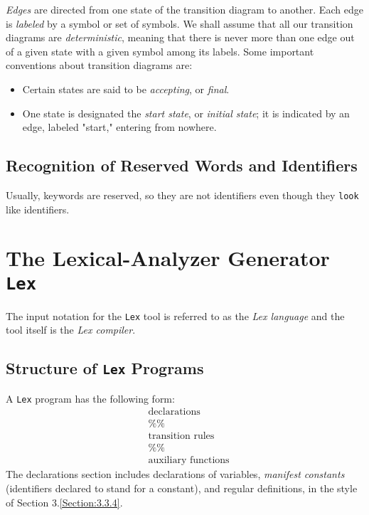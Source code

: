 \documentclass[a4paper,twoside]{book}
\begin{document}
\textit{Edges} are directed from one state of the transition diagram to another. Each edge is \textit{labeled} by a symbol or set of symbols. We shall assume that all our transition diagrams are \textit{deterministic}, meaning that there is never more than one edge out of a given state with a given symbol among its labels. Some important conventions about transition diagrams are:
\begin{itemize}
    \item Certain states are said to be \textit{accepting}, or \textit{final}.
    \item One state is designated the \textit{start state}, or \textit{initial state}; it is indicated by an edge, labeled "start," entering from nowhere.
\end{itemize}

\subsection{Recognition of Reserved Words and Identifiers}

Usually, keywords are reserved, so they are not identifiers even though they \verb|look| like identifiers.

\section{The Lexical-Analyzer Generator \texttt{Lex}}

The input notation for the \verb|Lex| tool is referred to as the \textit{Lex language} and the tool itself is the \textit{Lex compiler}.

\subsection{Structure of \texttt{Lex} Programs}

A \verb|Lex| program has the following form:
\begin{equation*}
    \begin{aligned}&\text{declarations}\\&\%\%\\&\text{transition rules}\\&\%\%\\&\text{auxiliary functions}\end{aligned}
\end{equation*}
The declarations section includes declarations of variables, \textit{manifest constants} (identifiers declared to stand for a constant), and regular definitions, in the style of Section 3.\ref{Section:3.3.4}.
\end{document}
